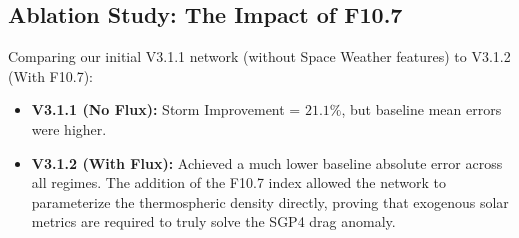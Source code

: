 \subsection{Ablation Study: The Impact of F10.7}
Comparing our initial V3.1.1 network (without Space Weather features) to V3.1.2 (With F10.7):
\begin{itemize}
    \item \textbf{V3.1.1 (No Flux):} Storm Improvement = $21.1\%$, but baseline mean errors were higher.
    \item \textbf{V3.1.2 (With Flux):} Achieved a much lower baseline absolute error across all regimes. The addition of the F10.7 index allowed the network to parameterize the thermospheric density directly, proving that exogenous solar metrics are required to truly solve the SGP4 drag anomaly.
\end{itemize}


